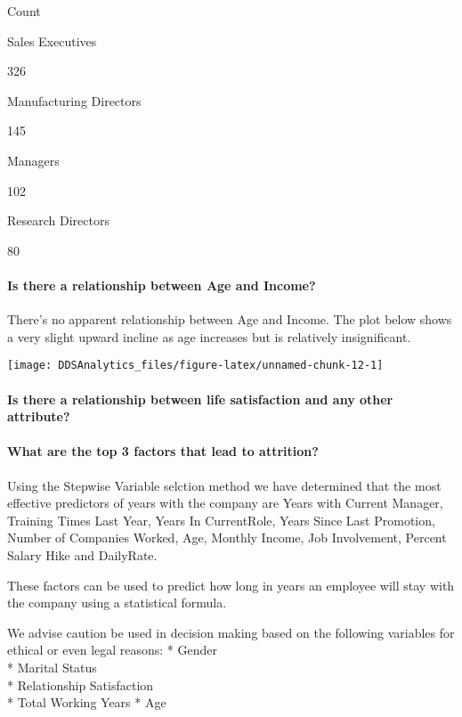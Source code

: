 \documentclass[]{article}
\let\oldparagraph\paragraph
\renewcommand{\paragraph}[1]{\oldparagraph{#1}\mbox{}}
\begin{document}
Count

Sales Executives

326

Manufacturing Directors

145

Managers

102

Research Directors

80

\paragraph{Is there a relationship between Age and
Income?}\label{is-there-a-relationship-between-age-and-income}

There's no apparent relationship between Age and Income. The plot below
shows a very slight upward incline as age increases but is relatively
insignificant.

\begin{center}\texttt{[image: DDSAnalytics\_files/figure-latex/unnamed-chunk-12-1]} \end{center}

\paragraph{Is there a relationship between life satisfaction and any
other
attribute?}\label{is-there-a-relationship-between-life-satisfaction-and-any-other-attribute}

\paragraph{What are the top 3 factors that lead to
attrition?}\label{what-are-the-top-3-factors-that-lead-to-attrition}

Using the Stepwise Variable selction method we have determined that the
most effective predictors of years with the company are Years with
Current Manager, Training Times Last Year, Years In CurrentRole, Years
Since Last Promotion, Number of Companies Worked, Age, Monthly Income,
Job Involvement, Percent Salary Hike and DailyRate.

These factors can be used to predict how long in years an employee will
stay with the company using a statistical formula.

We advise caution be used in decision making based on the following
variables for ethical or even legal reasons: * Gender\\
* Marital Status\\
* Relationship Satisfaction\\
* Total Working Years * Age
\end{document}
